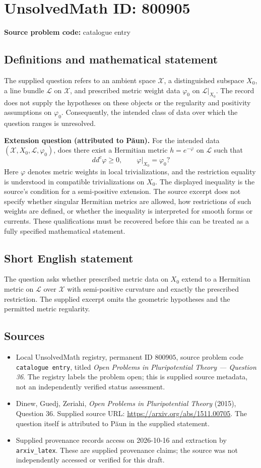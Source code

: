 \documentclass[11pt]{article}
\begin{document}
\section*{UnsolvedMath ID: 800905}
\textbf{Source problem code:} catalogue entry
\subsection{Definitions and mathematical statement}
The supplied question refers to an ambient space $\mathcal X$, a distinguished subspace $X_0$, a line bundle $\mathcal L$ on $\mathcal X$, and prescribed metric weight data $\varphi_0$ on $\mathcal L|_{X_0}$. The record does not supply the hypotheses on these objects or the regularity and positivity assumptions on $\varphi_0$. Consequently, the intended class of data over which the question ranges is unresolved.

\textbf{Extension question (attributed to P\u{a}un).} For the intended data $(\mathcal X,X_0,\mathcal L,\varphi_0)$, does there exist a Hermitian metric $h=e^{-\varphi}$ on $\mathcal L$ such that
\[
 dd^c\varphi\geq 0,
 \qquad
 \varphi|_{X_0}=\varphi_0?
\]
Here $\varphi$ denotes metric weights in local trivializations, and the restriction equality is understood in compatible trivializations on $X_0$. The displayed inequality is the source's condition for a semi-positive extension. The source excerpt does not specify whether singular Hermitian metrics are allowed, how restrictions of such weights are defined, or whether the inequality is interpreted for smooth forms or currents. These qualifications must be recovered before this can be treated as a fully specified mathematical statement.
\subsection{Short English statement}
The question asks whether prescribed metric data on $X_0$ extend to a Hermitian metric on $\mathcal L$ over $\mathcal X$ with semi-positive curvature and exactly the prescribed restriction. The supplied excerpt omits the geometric hypotheses and the permitted metric regularity.
\subsection{Sources}
\begin{itemize}
\item Local UnsolvedMath registry, permanent ID $800905$, source problem code \texttt{catalogue entry}, titled \emph{Open Problems in Pluripotential Theory --- Question 36}. The registry labels the problem open; this is supplied source metadata, not an independently verified status assessment.
\item Dinew, Guedj, Zeriahi, \emph{Open Problems in Pluripotential Theory} (2015), Question 36. Supplied source URL: \url{https://arxiv.org/abs/1511.00705}. The question itself is attributed to P\u{a}un in the supplied statement.
\item Supplied provenance records access on 2026-10-16 and extraction by \texttt{arxiv\_latex}. These are supplied provenance claims; the source was not independently accessed or verified for this draft.
\end{itemize}
\end{document}
